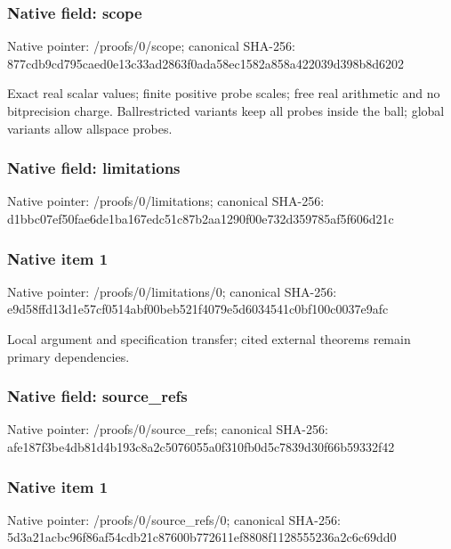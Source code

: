 \documentclass[10pt,a4paper]{article}
\begin{document}
\subsubsection{Native field: scope}


Native pointer: /proofs/0/scope; canonical SHA-256: 877cdb9cd795caed0e13c33a\allowbreak{}d2863f0ada58ec1582a858a4\allowbreak{}22039d398b8d6202


Exact real scalar values; finite positive probe scales; free real arithmetic and no bitprecision charge. Ballrestricted variants keep all probes inside the ball; global variants allow allspace probes.


\subsubsection{Native field: limitations}


Native pointer: /proofs/0/limitations; canonical SHA-256: d1bbc07ef50fae6de1ba167e\allowbreak{}dc51c87b2aa1290f00e732d3\allowbreak{}59785af5f606d21c



\subsubsection{Native item 1}


Native pointer: /proofs/0/limitations/0; canonical SHA-256: e9d58ffd13d1e57cf0514abf\allowbreak{}00beb521f4079e5d6034541c\allowbreak{}0bf100c0037e9afc


Local argument and specification transfer; cited external theorems remain primary dependencies.


\subsubsection{Native field: source\_refs}


Native pointer: /proofs/0/source\_refs; canonical SHA-256: afe187f3be4db81d4b193c8a\allowbreak{}2c5076055a0f310fb0d5c783\allowbreak{}9d30f66b59332f42



\subsubsection{Native item 1}


Native pointer: /proofs/0/source\_refs/0; canonical SHA-256: 5d3a21acbc96f86af54cdb21\allowbreak{}c87600b772611ef8808f1128\allowbreak{}555236a2c6c69dd0
\end{document}
